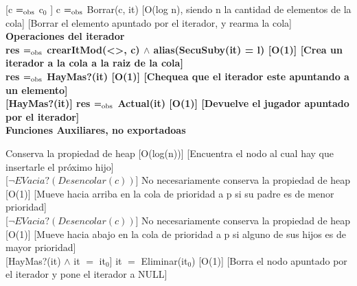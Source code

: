 [c $=_{\mathrm{obs}}$ c$_0$ ]
{c $=_{\mathrm{obs}}$ Borrar(c, it)}
[O(log n), siendo n la cantidad de elementos de la cola]
[Borrar el elemento apuntado por el iterador, y rearma la cola]\\

\bf{Operaciones del iterador}
\\
{res $=_{\mathrm{obs}}$ crearItMod(<>, c) $\wedge$ alias(SecuSuby(it) = l)}
[O(1)]
[Crea un iterador a la cola a la raiz de la cola]\\

{res $=_{\mathrm{obs}}$ HayMas?(it)}
[O(1)]
[Chequea que el iterador este apuntando a un elemento]\\

[HayMas?(it)]
{res $=_{\mathrm{obs}}$ Actual(it)}
[O(1)]
[Devuelve el jugador apuntado por el iterador]\\

\bf{Funciones Auxiliares, no exportadoas}

{Conserva la propiedad de heap}
[O(log(n))]
[Encuentra el nodo al cual hay que insertarle el próximo hijo]\\

[$\neg EVacia?(Desencolar(c))$]
{No necesariamente conserva la propiedad de heap}
[O(1)]
[Mueve hacia arriba en la cola de prioridad a p si su padre es de menor prioridad]\\

[$\neg EVacia?(Desencolar(c))$]
{No necesariamente conserva la propiedad de heap}
[O(1)]
[Mueve hacia abajo en la cola de prioridad a p si alguno de sus hijos es de mayor prioridad]\\

[HayMas?(it) $\wedge$ it $=$ it$_0$]
{it $=$ Eliminar(it$_0$)}
[O(1)]
[Borra el nodo apuntado por el iterador y pone el iterador a NULL]\\



